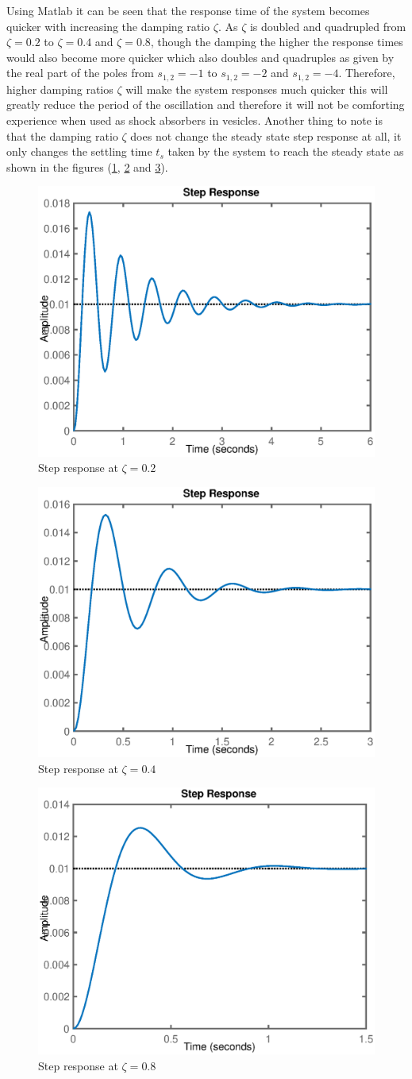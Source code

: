 Using Matlab it can be seen that the response time of the system becomes quicker with increasing the damping ratio $\zeta$. As $\zeta$ is doubled and quadrupled from $\zeta = 0.2$ to $\zeta = 0.4$ and $\zeta = 0.8$, though the damping the higher the response times would also become more quicker which also doubles and quadruples as given by the real part of the poles from $s_{1,2} = -1$ to $s_{1,2} = -2$ and $s_{1,2} = -4$. Therefore, higher damping ratios $\zeta$ will make the system responses much quicker this will greatly reduce the period of the oscillation and therefore it will not be comforting experience when used as shock absorbers in vesicles. Another thing to note is that the damping ratio $\zeta$ does not change the steady state step response at all, it only changes the settling time $t_s$ taken by the system to reach the steady state as shown in the figures (\ref{Fig_stepResponsez_02}, \ref{Fig_stepResponsez_04} and \ref{Fig_stepResponsez_08}).
\begin{figure}[h!]
	\centering
	\includegraphics[width=0.5\linewidth]{Bilder/stepResponsez_02.eps}
	\caption{Step response at $\zeta = 0.2$}
	\label{Fig_stepResponsez_02}
\end{figure}
\begin{figure}[h!]
	\centering
	\includegraphics[width=0.5\linewidth]{Bilder/stepResponsez_04.eps}
	\caption{Step response at $\zeta = 0.4$}
	\label{Fig_stepResponsez_04}
\end{figure}
\begin{figure}[h!]
	\centering
	\includegraphics[width=0.5\linewidth]{Bilder/stepResponsez_08.eps}
	\caption{Step response at $\zeta = 0.8$}
	\label{Fig_stepResponsez_08}
\end{figure}

